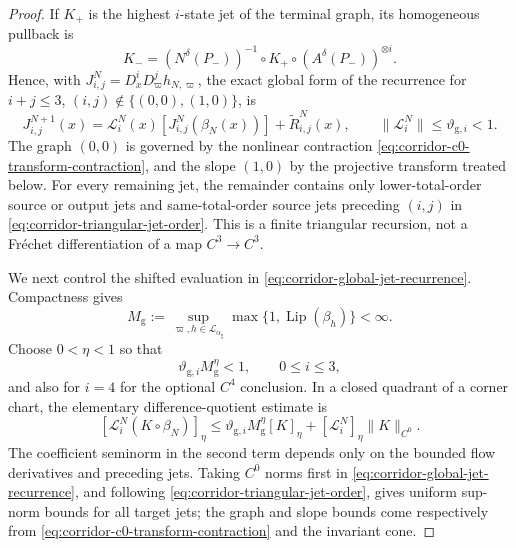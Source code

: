 \documentclass[11pt]{amsart}
\numberwithin{equation}{section}
\theoremstyle{definition}
\theoremstyle{remark}
\begin{document}
\begin{proof}
If $K_+$ is the highest $i$-state jet of the terminal graph, its
homogeneous pullback is
\[
 K_-=(N^\delta(P_-))^{-1}\circ K_+
          \circ(A^\delta(P_-))^{\otimes i}.
\]
Hence, with $J_{i,j}^N=D_x^iD_\varpi^jh_{N,\varpi}$, the exact global
form of the recurrence for
$i+j\le3$, $(i,j)\notin\{(0,0),(1,0)\}$, is
\begin{equation}\label{eq:corridor-global-jet-recurrence}
 J_{i,j}^{N+1}(x)
 =\mathcal L_i^N(x)
    [J_{i,j}^{N}(\beta_N(x))]+\widetilde R_{i,j}^N(x),
 \qquad \|\mathcal L_i^N\|\le\vartheta_{\mathrm g,i}<1.
\end{equation}
The graph $(0,0)$ is governed by the nonlinear contraction
\eqref{eq:corridor-c0-transform-contraction}, and the slope $(1,0)$ by the
projective transform treated below.  For every remaining jet, the remainder
contains only lower-total-order source or output jets and
same-total-order source jets preceding $(i,j)$ in
\eqref{eq:corridor-triangular-jet-order}.  This is a finite triangular
recursion, not a Fr\'echet differentiation of a map $C^3\to C^3$.

We next control the shifted evaluation in
\eqref{eq:corridor-global-jet-recurrence}.  Compactness gives
\[
 M_{\mathrm g}:=
 \sup_{\varpi,h\in\mathcal L_{\alpha_{\mathrm g}}}
       \max\{1,\operatorname{Lip}(\beta_h)\}<\infty.
\]
Choose $0<\eta<1$ so that
\begin{equation}\label{eq:corridor-fractional-jet-gaps}
 \vartheta_{\mathrm g,i}M_{\mathrm g}^{\eta}<1,
 \qquad 0\le i\le3,
\end{equation}
and also for $i=4$ for the optional $C^4$ conclusion.  In a closed
quadrant of a corner chart, the elementary difference-quotient estimate is
\begin{equation}\label{eq:corridor-shifted-holder-estimate}
 [\mathcal L_i^N(K\circ\beta_N)]_\eta
 \le \vartheta_{\mathrm g,i}M_{\mathrm g}^{\eta}[K]_\eta
      +[\mathcal L_i^N]_\eta\|K\|_{C^0}.
\end{equation}
The coefficient seminorm in the second term depends only on the bounded
flow derivatives and preceding jets.  Taking $C^0$ norms first in
\eqref{eq:corridor-global-jet-recurrence}, and following
\eqref{eq:corridor-triangular-jet-order}, gives uniform sup-norm bounds for
all target jets; the graph and slope bounds come respectively from
\eqref{eq:corridor-c0-transform-contraction} and the invariant cone.


\end{proof}
\end{document}
